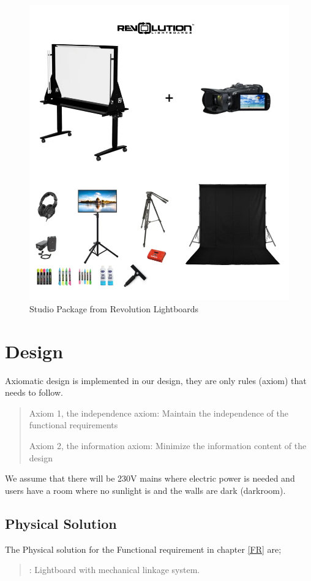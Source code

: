 \documentclass[a4paper]{jpconf}
\begin{document}
\begin{figure}
	\centering
	\includegraphics[width=0.7\linewidth]{Revolution.png}
	\caption{ Studio Package from Revolution Lightboards \cite{Revolution}}
	\label{fig:REV}
\end{figure}






\section{Design}
Axiomatic design is implemented in our design, they are only rules (axiom) that needs to follow\cite{suh2001axiomatic}.  
\begin{quote}
	Axiom 1, the independence axiom:
	Maintain the independence of the functional requirements
	
	Axiom 2, the information axiom:
	Minimize the information content of the design
\end{quote}

We assume that there will be 230V mains where electric power is needed and users have a room where no sunlight is and the walls are dark (darkroom).     %

\subsection{Physical Solution}\label{PS}
The Physical solution for the Functional requirement in chapter \ref{FR} are;
\begin{quote} 
	\textbf{} : Lightboard with mechanical linkage system.
\end{quote}
\end{document}

